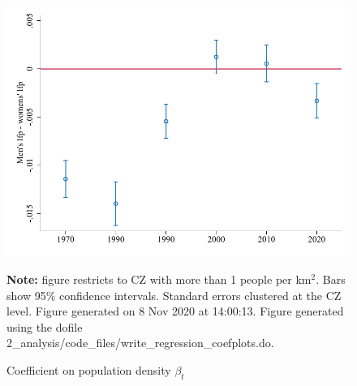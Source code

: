 \begin{figure}[!h]
\centering
\caption{Coefficient on population density $ \beta_t $}
\includegraphics[width=1\textwidth]{../2_analysis/output/figures/lfp_gap_full_time}
\par \begin{minipage}[h]{\textwidth}{\tiny\textbf{Note:} figure restricts to CZ with more than 1 people per km$^2$. Bars show 95\% confidence intervals. Standard errors clustered at the CZ level. Figure generated on  8 Nov 2020 at 14:00:13. Figure generated using the dofile 2\_analysis/code\_files/write\_regression\_coefplots.do.}\end{minipage}
\end{figure}
